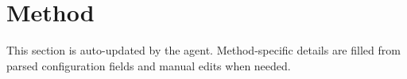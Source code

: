 \section{Method}
This section is auto-updated by the agent. Method-specific details are filled from parsed configuration fields and manual edits when needed.

